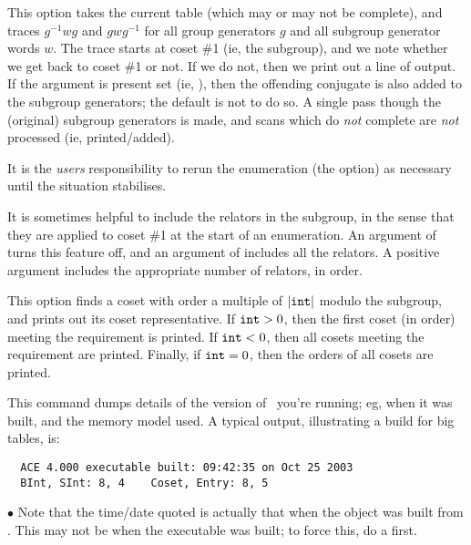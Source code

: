 \quad{}

This option takes the current table (which may or may not be complete),
  and traces $g^{-1}wg$ and $gwg^{-1}$ for all group generators $g$ and 
  all subgroup generator words $w$.
The trace starts at coset \#1 (ie, the subgroup), and we note whether we
  get back to coset \#1 or not.
If we do not, then we print out a line of output.
If the argument is present \amp set (ie, ), then the offending
  conjugate is also added to the subgroup generators; the default is not
  to do so.
A single pass though the (original) subgroup generators is made, and scans
  which do \emph{not} complete are \emph{not} processed 
  (ie, printed/added).

It is the \emph{users} responsibility to rerun the enumeration (\amp the 
   option) as necessary until the situation stabilises.

\quad{}

It is sometimes helpful to include the relators in the subgroup, in the
  sense that they are applied to coset \#1 at the start of an enumeration.
An argument of  turns this feature off, and an argument of 
  includes all the relators.
A positive argument includes the appropriate number of relators, in order.

\quad{}

This option finds a coset with order a multiple of $|\texttt{int}|$ modulo
  the subgroup, and prints out its coset representative.
If $\texttt{int} > 0$, then the first coset (in order) meeting the requirement
  is printed.
If $\texttt{int} < 0$, then all cosets meeting the requirement are printed.
Finally, if $\texttt{int} = 0$, then the orders of all cosets are printed.

\quad{} 

This command dumps details of the version of \ace\ you're running; eg,
  when it was built, and the memory model used.
A typical output, illustrating a build for big tables, is:
 
\bv\begin{verbatim}
  ACE 4.000 executable built: 09:42:35 on Oct 25 2003
  BInt, SInt: 8, 4    Coset, Entry: 8, 5
\end{verbatim}\ev

$\bullet$
Note that the time/date quoted is actually that when the 
  object was built from .
This may not be when the executable was built; to force this, do a
    first.

